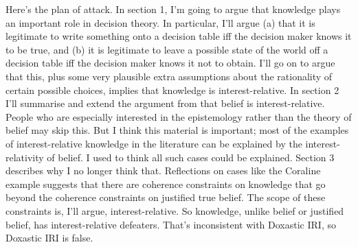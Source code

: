 Here's the plan of attack. In section 1, I'm going to argue that knowledge plays an important role in decision theory. In particular, I'll argue (a) that it is legitimate to write something onto a decision table iff the decision maker knows it to be true, and (b) it is legitimate to leave a possible state of the world off a decision table iff the decision maker knows it not to obtain. I'll go on to argue that this, plus some very plausible extra assumptions about the rationality of certain possible choices, implies that knowledge is interest-relative. In section 2 I'll summarise and extend the argument from \cite{Weatherson2005-WEACWD} that belief is interest-relative. People who are especially interested in the epistemology rather than the theory of belief may skip this. But I think this material is important; most of the examples of interest-relative knowledge in the literature can be explained by the interest-relativity of belief. I used to think all such cases could be explained. Section 3 describes why I no longer think that. Reflections on cases like the Coraline example suggests that there are coherence constraints on knowledge that go beyond the coherence constraints on justified true belief. The scope of these constraints is, I'll argue, interest-relative. So knowledge, unlike belief or justified belief, has interest-relative defeaters. That's inconsistent with Doxastic IRI, so Doxastic IRI is false.
